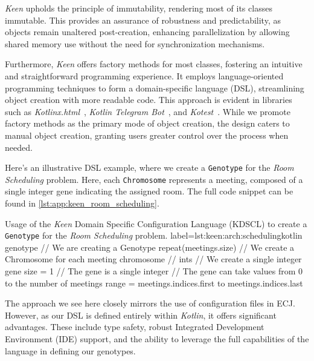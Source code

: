     \textit{Keen} upholds the principle of immutability, rendering most of its classes immutable.
    This provides an assurance of robustness and predictability, as objects remain unaltered post-creation, enhancing parallelization by allowing shared memory use without the need for synchronization mechanisms.

    Furthermore, \textit{Keen} offers factory methods for most classes, fostering an intuitive and straightforward programming experience.
    It employs language-oriented programming techniques to form a domain-specific language (DSL), streamlining object creation with more readable code.
    This approach is evident in libraries such as \textit{Kotlinx.html}~\autocite{KotlinxHtml2023}, \textit{Kotlin Telegram Bot}~\autocite{KotlinTelegramBot2023}, and \textit{Kotest}~\autocite{KotestKotesta}.
    While we promote factory methods as the primary mode of object creation, the design caters to manual object creation, granting users greater control over the process when needed.


    Here's an illustrative DSL example, where we create a \texttt{Genotype} for the \textit{Room Scheduling} problem.
    Here, each \texttt{Chromosome} represents a meeting, composed of a single integer gene indicating the assigned room.
    The full code snippet can be found in \vref{lst:app:keen_room_scheduling}.

    \begin{code}{
        Usage of the \textit{Keen} Domain Specific Configuration Language 
        (KDSCL) to create a \texttt{Genotype} for the \textit{Room
        Scheduling} problem.
    }{label={lst:keen:arch:scheduling}}{kotlin}
        genotype {                  // We are creating a Genotype
            repeat(meetings.size) { // We create a Chromosome for each meeting
                chromosome {        //
                    ints {          // We create a single integer gene
                        size = 1    // The gene is a single integer
                        // The gene can take values from 0 to the number of meetings
                        range = meetings.indices.first to meetings.indices.last
                    }
                }
            }
        }
    \end{code}

    The approach we see here closely mirrors the use of configuration files in 
    ECJ.
    However, as our DSL is defined entirely within \textit{Kotlin}, it offers 
    significant advantages.
    These include type safety, robust Integrated Development Environment (IDE) 
    support, and the ability to leverage the full capabilities of the language 
    in defining our genotypes.

